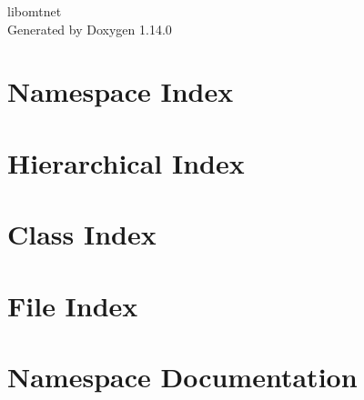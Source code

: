\documentclass[twoside]{book}
\newcommand{\+}{\discretionary{\mbox{\scriptsize$\hookleftarrow$}}{}{}}
\newcommand{\clearemptydoublepage}{%
    \newpage{\pagestyle{empty}\cleardoublepage}%
  }
\begin{document}
  \raggedbottom
    \hypersetup{pageanchor=false,
                bookmarksnumbered=true,
                pdfencoding=unicode
               }
  \begin{titlepage}
  \vspace*{7cm}
  \begin{center}%
  {\Large libomtnet}\\
  \vspace*{1cm}
  {\large Generated by Doxygen 1.14.0}\\
  \end{center}
  \end{titlepage}
  \clearemptydoublepage
  \tableofcontents
  \clearemptydoublepage
  \hypersetup{pageanchor=true}

\chapter{Namespace Index}

\chapter{Hierarchical Index}

\chapter{Class Index}

\chapter{File Index}

\chapter{Namespace Documentation}






\end{document}
